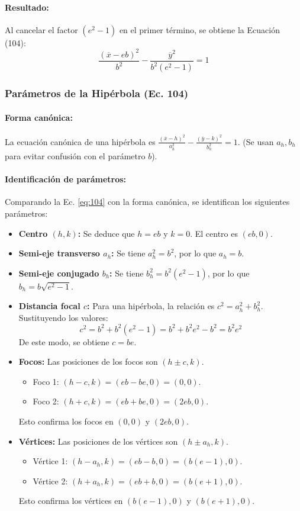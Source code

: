 \documentclass[12pt, a4paper]{article}
\newcommand{\xbar}{\overline{x}}
\newcommand{\ybar}{\overline{y}}
\begin{document}
\paragraph{Resultado:} Al cancelar el factor $(e^{2}-1)$ en el primer término, se obtiene la Ecuación (104):
\begin{equation}
    \frac{(\xbar-eb)^{2}}{b^{2}}-\frac{\ybar^{2}}{b^{2}(e^{2}-1)}=1
    \label{eq:104}
\end{equation}

\subsubsection*{Parámetros de la Hipérbola (Ec. 104)}

\paragraph{Forma canónica:} La ecuación canónica de una hipérbola es $\frac{(\xbar - h)^{2}}{a_{h}^{2}} - \frac{(\ybar - k)^{2}}{b_{h}^{2}} = 1$. (Se usan $a_h, b_h$ para evitar confusión con el parámetro $b$).

\paragraph{Identificación de parámetros:} Comparando la Ec. \eqref{eq:104} con la forma canónica, se identifican los siguientes parámetros:
\begin{itemize}
    \item \textbf{Centro $(h, k)$:} Se deduce que $h = eb$ y $k = 0$. El centro es $(eb, 0)$.
    \item \textbf{Semi-eje transverso $a_h$:} Se tiene $a_{h}^{2} = b^{2}$, por lo que $a_h = b$.
    \item \textbf{Semi-eje conjugado $b_h$:} Se tiene $b_{h}^{2} = b^{2}(e^{2}-1)$, por lo que $b_h = b\sqrt{e^{2}-1}$.
    \item \textbf{Distancia focal $c$:} Para una hipérbola, la relación es $c^{2} = a_{h}^{2} + b_{h}^{2}$. Sustituyendo los valores:
    \[
        c^{2} = b^{2} + b^{2}(e^{2}-1) = b^{2} + b^{2}e^{2} - b^{2} = b^{2}e^{2}
    \]
    De este modo, se obtiene $c = be$.
    \item \textbf{Focos:} Las posiciones de los focos son $(h \pm c, k)$.
    \begin{itemize}
        \item Foco 1: $(h-c, k) = (eb - be, 0) = (0, 0)$.
        \item Foco 2: $(h+c, k) = (eb + be, 0) = (2eb, 0)$.
    \end{itemize}
    Esto confirma los focos en $(0, 0)$ y $(2eb, 0)$.
    \item \textbf{Vértices:} Las posiciones de los vértices son $(h \pm a_h, k)$.
    \begin{itemize}
        \item Vértice 1: $(h-a_h, k) = (eb - b, 0) = (b(e-1), 0)$.
        \item Vértice 2: $(h+a_h, k) = (eb + b, 0) = (b(e+1), 0)$.
    \end{itemize}
    Esto confirma los vértices en $(b(e-1), 0)$ y $(b(e+1), 0)$.
\end{itemize}
\end{document}
